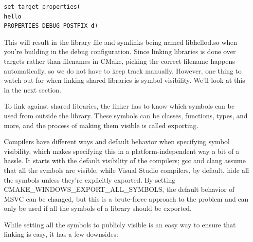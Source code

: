 \begin{lstlisting}[style=styleCMake]
set_target_properties(
hello
PROPERTIES DEBUG_POSTFIX d)
\end{lstlisting}

This will result in the library file and symlinks being named libhellod.so when you're building in the debug configuration. Since linking libraries is done over targets rather than filenames in CMake, picking the correct filename happens automatically, so we do not have to keep track manually. However, one thing to watch out for when linking shared libraries is symbol visibility. We'll look at this in the next section.


To link against shared libraries, the linker has to know which symbols can be used from outside the library. These symbols can be classes, functions, types, and more, and the process of making them visible is called exporting.

Compilers have different ways and default behavior when specifying symbol visibility, which makes specifying this in a platform-independent way a bit of a hassle. It starts with the default visibility of the compilers; gcc and clang assume that all the symbols are visible, while Visual Studio compilers, by default, hide all the symbols unless they're explicitly exported. By setting CMAKE\_WINDOWS\_EXPORT\_ALL\_SYMBOLS, the default behavior of MSVC can be changed, but this is a brute-force approach to the problem and can only be used if all the symbols of a library should be exported.

While setting all the symbols to publicly visible is an easy way to ensure that linking is easy, it has a few downsides:

